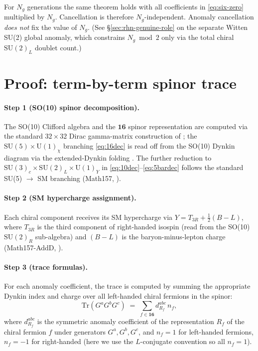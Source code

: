 \begin{remark}\label{rmk:multigen}
For $N_g$ generations the same theorem holds with all coefficients
in \eqref{eq:six-zero} multiplied by $N_g$. Cancellation is therefore
$N_g$-independent. Anomaly cancellation \emph{does not} fix the value
of $N_g$. (See \S\ref{sec:rhn-genuine-role} on the separate Witten
SU(2) global anomaly, which constrains $N_g\bmod 2$ only via the
total chiral $\mathrm{SU}(2)_L$ doublet count.)
\end{remark}

\section{Proof: term-by-term spinor trace}\label{sec:proof}
\paragraph{Step 1 (SO(10) spinor decomposition).}
The SO(10) Clifford algebra and the $\mathbf{16}$ spinor
representation are computed via the standard $32\times 32$ Dirac
gamma-matrix construction of \cite{GeorgiBook}; the
$\mathrm{SU}(5)\times \mathrm{U}(1)_\chi$ branching
\eqref{eq:16dec} is read off from the SO(10) Dynkin diagram via the
extended-Dynkin folding \cite{Slansky1981}. The further reduction to
$\mathrm{SU}(3)_c\times\mathrm{SU}(2)_L\times\mathrm{U}(1)_Y$ in
\eqref{eq:10dec}--\eqref{eq:5bardec} follows the standard
SU(5) $\to$ SM branching (Math157, \cite{Math157}).

\paragraph{Step 2 (SM hypercharge assignment).}
Each chiral component receives its SM hypercharge via
$Y = T_{3R} + \tfrac{1}{2}(B-L)$, where $T_{3R}$ is the third
component of right-handed isospin (read from the SO(10)
$\mathrm{SU}(2)_R$ sub-algebra) and $(B-L)$ is the baryon-minus-lepton
charge (Math157-AddD, \cite{Math157AddD}).

\paragraph{Step 3 (trace formulas).}
For each anomaly coefficient, the trace is computed by summing the
appropriate Dynkin index and charge over all left-handed chiral
fermions in the spinor:
\begin{equation}\label{eq:trace-formula}
  \mathrm{Tr}(G^a G^b G^c) \;=\; \sum_{f\in\mathbf{16}} d^{abc}_{R_f}\,n_f,
\end{equation}
where $d^{abc}_{R_f}$ is the symmetric anomaly coefficient of the
representation $R_f$ of the chiral fermion $f$ under generators
$G^a,G^b,G^c$, and $n_f=1$ for left-handed fermions, $n_f=-1$ for
right-handed (here we use the $L$-conjugate convention so all $n_f=1$).

